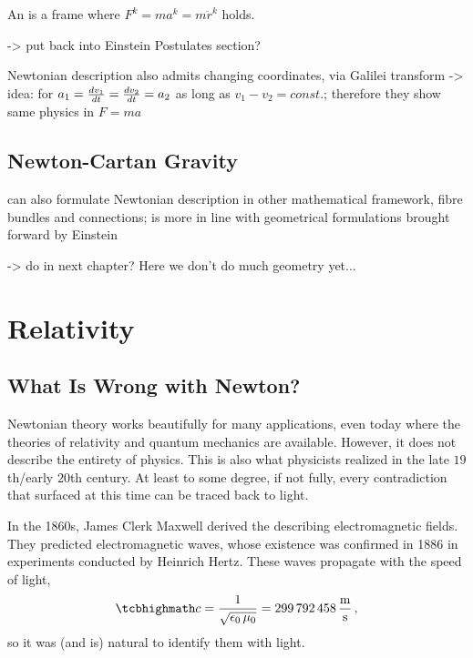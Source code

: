 \begin{defi}
	An  is a frame where $F^k = m a^k = m \ddot{r}^k$ holds.
\end{defi}
-> put back into Einstein Postulates section?

Newtonian description also admits changing coordinates, via Galilei transform -> idea: for $a_1 = \dv{v_1}{t} = \dv{v_2}{t} = a_2$ as long as $v_1 - v_2 = const.$; therefore they show same physics in $F = m a$




		\subsection{Newton-Cartan Gravity}
can also formulate Newtonian description in other mathematical framework, fibre bundles and connections; is more in line with geometrical formulations brought forward by Einstein

-> do in next chapter? Here we don't do much geometry yet...



\newpage



	\section{Relativity}
		\subsection{What Is Wrong with Newton?}
Newtonian theory works beautifully for many applications, even today where the theories of relativity and quantum mechanics are available. However, it does not describe the entirety of physics. This is also what physicists realized in the late $19$th/early $20$th century. At least to some degree, if not fully, every contradiction that surfaced at this time can be traced back to light.

In the 1860s, James Clerk Maxwell derived the  describing electromagnetic fields. They predicted electromagnetic waves, whose existence was confirmed in 1886 in experiments conducted by Heinrich Hertz. These waves propagate with the speed of light,
\begin{equation}\label{eq:speed_of_light}
	\eqbox{
	c = \frac{1}{\sqrt{\epsilon_0 \, \mu_0}} = 299 \, 792 \, 458 \, \frac{\metre}{\second}
	} \, ,
\end{equation}
so it was (and is) natural to identify them with light.


